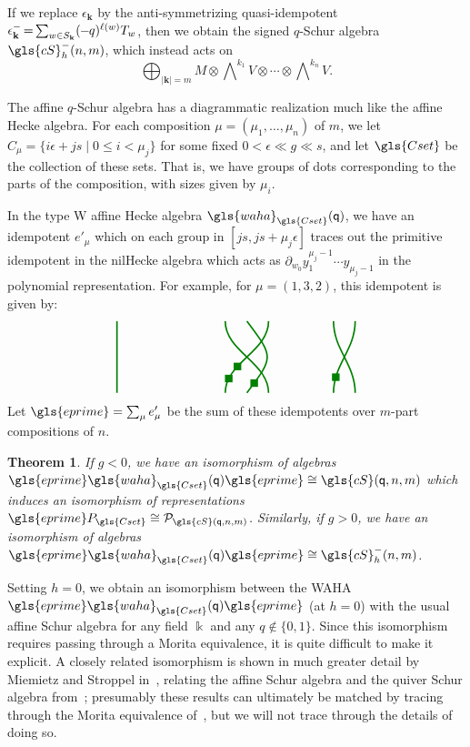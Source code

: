 \documentclass[10pt]{article}
\newtheorem{theorem}{Theorem}[section]
\theoremstyle{definition}
\newcommand{\iwedge}[1]{\bigwedge\nolimits^{\! #1}}
\newcommand{\ck}{g}
\newcommand{\Bk}{\mathbf{k}}
\newcommand{\pq}{\mathsf{q}}
\newcommand{\K}{\Bbbk}%
\newcommand{\cP}{\mathcal{P}}
\newcommand{\cS}{\gls{cS}}
\newcommand{\waha}{\gls{waha}}
\newcommand*{\mk}{\mkern -1mu}
\newcommand*{\Mk}{\mkern -2mu}
\begin{document}
If we replace $\epsilon_{\Bk}$ by the anti-symmetrizing quasi-idempotent
$\epsilon_{\Bk}^-\Mk =\Mk \sum_{w\in S_{\Bk}} (\mk -\mk q)^{\ell(w)}T_w$, then we obtain the signed
$q$-Schur algebra $\cS_h^-(n,m)$, which instead acts on \[\bigoplus
_{|\Bk|=m}M\otimes \iwedge{ k_1}V\otimes \cdots\otimes
\iwedge{k_n}V.\]

The affine $q$-Schur algebra has a diagrammatic realization much like the
affine Hecke algebra. For each composition $\mu=(\mu_1,\dots, \mu_n)$
of $m$, we let $C_\mu=\{i\epsilon+js\mid 0\leq i< \mu_j\}$ for some
fixed $0< \epsilon \ll g \ll s$, and let $\gls{Cset}$ be the
collection of these sets. That is, we have groups of dots
corresponding to the parts of the composition, with sizes given by
$\mu_i$. 

In the type W affine Hecke algebra
$\waha_{\gls{Cset}}(\pq)$, we have an idempotent $e'_\mu$ which on each
group in $[js,js+\mu_j\epsilon]$ traces out the primitive idempotent
in the nilHecke algebra which acts as $\partial_{w_0} y^{\mu_j-1}_1\cdots
y_{\mu_j-1}$ in the polynomial representation. For example, for
$\mu=(1,3,2)$, this idempotent is given by:
\[
\begin{tikzpicture}[very thick,xscale=1.5,baseline,green!50!black]
 \draw (0,-1) -- (0,1);
 \draw (4,-1) to[out=90,in=-90] node[pos=.2,fill=green!50!black,inner
 sep=3pt]{} (4.4, 1);
 \draw (4.4,-1) to[out=90,in=-90] (4, 1);
 \draw (2,-1) to[out=90,in=-90] node[pos=.35,fill=green!50!black,inner
 sep=3pt]{}node[pos=.175,fill=green!50!black,inner
 sep=3pt]{} (2.8, 1);
 \draw (2.8,-1) to[out=90,in=-90] (2, 1);
 \draw (2.4,-1) .. controls (2.9,0) .. node[pos=.1,fill=green!50!black,inner
 sep=3pt]{} (2.4, 1);
\end{tikzpicture}
\]
 Let
$\gls{eprime}=\sum_\mu e'_\mu$ be the sum of these idempotents over $m$-part
compositions of $n$.

\begin{theorem}\label{waha-Schur}
If $\ck<0$, we have an isomorphism of algebras $\gls{eprime} \waha_{\gls{Cset}}(\pq) \gls{eprime}\cong \cS(\pq,n,m)$
 which induces an isomorphism of representations $\gls{eprime}
 P_{\gls{Cset}}\cong \cP_{\cS(\pq,n,m)}$. Similarly, if $\ck>0$, we have an
 isomorphism of algebras $\gls{eprime} \waha_{\gls{Cset}}(\pq) \gls{eprime}\cong \cS_h^-(n,m)$.
\end{theorem}

 Setting $h=0$, we obtain an isomorphism between the WAHA $\gls{eprime} \waha_{\gls{Cset}}(\pq) \gls{eprime}$ (at $h=0$)
 with the usual affine Schur algebra for any field $\K$ and any
 $q\notin\{0,1\}$. Since this isomorphism requires passing through a
 Morita equivalence, it is quite difficult to make it explicit. A
 closely related isomorphism is shown in much greater detail by
 Miemietz and Stroppel in~\cite{MiSt}, relating the affine Schur
 algebra and the quiver Schur algebra from~\cite{SWschur}; presumably
 these results can ultimately be matched by tracing through the
 Morita equivalence of~\cite[Th.~3.8]{WebwKLR}, but we will not trace
 through the details of doing so. 
\end{document}
